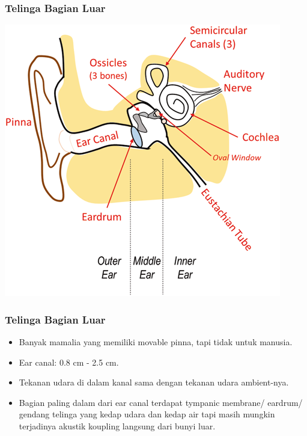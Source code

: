 \documentclass[pdflatex,compress]{beamer}
\begin{document}
\begin{frame}
	\frametitle{Telinga Bagian Luar}
	\begin{center}
		\includegraphics[height=0.9\textheight]{img/img015}
	\end{center}
\end{frame}

\begin{frame}
	\frametitle{Telinga Bagian Luar}
	\begin{itemize}
		\item Banyak mamalia yang memiliki movable pinna, tapi tidak untuk manusia.
		\item Ear canal: 0.8 cm - 2.5 cm.
		\item Tekanan udara di dalam kanal sama dengan tekanan udara ambient-nya.
		\item Bagian paling dalam dari ear canal terdapat tympanic membrane/ eardrum/ gendang telinga yang kedap udara dan kedap air tapi masih mungkin terjadinya akustik koupling langsung dari bunyi luar.
	\end{itemize}
\end{frame}
\end{document}
